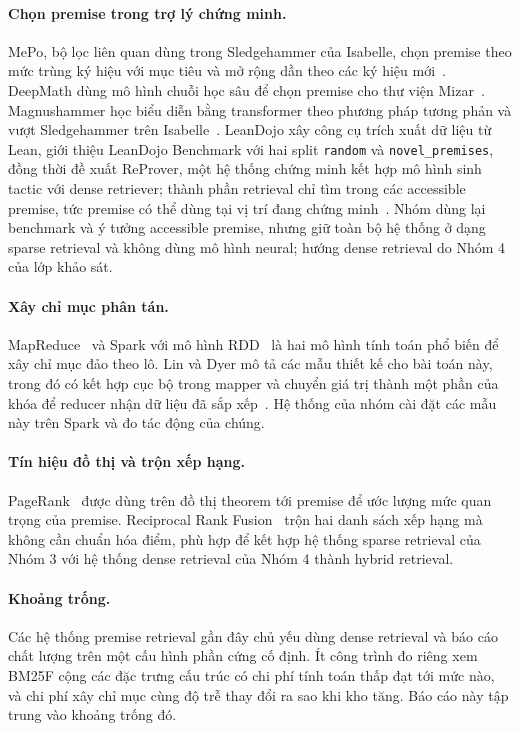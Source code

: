 \documentclass[11pt,a4paper,oneside]{report}
\newcommand{\code}[1]{\texttt{#1}}
\begin{document}
\paragraph{Chọn premise trong trợ lý chứng minh.} MePo, bộ lọc liên quan dùng trong Sledgehammer của Isabelle, chọn
premise theo mức trùng ký hiệu với mục tiêu và mở rộng dần theo các ký hiệu mới~\cite{meng2009}. DeepMath dùng mô hình
chuỗi học sâu để chọn premise cho thư viện Mizar~\cite{irving2016}. Magnushammer học biểu diễn bằng transformer theo
phương pháp tương phản và vượt Sledgehammer trên Isabelle~\cite{mikula2024}. LeanDojo xây công cụ trích xuất dữ liệu từ
Lean, giới thiệu LeanDojo Benchmark với hai split \code{random} và \code{novel\_premises}, đồng thời đề xuất ReProver, một
hệ thống chứng minh kết hợp mô hình sinh tactic với dense retriever; thành phần retrieval chỉ tìm trong các accessible
premise, tức premise có thể dùng tại vị trí đang chứng minh~\cite{yang2023,leandojodocs}.
Nhóm dùng lại benchmark và ý tưởng accessible premise, nhưng giữ toàn bộ hệ thống ở dạng sparse retrieval và không dùng
mô hình neural; hướng dense retrieval do Nhóm 4 của lớp khảo sát.

\paragraph{Xây chỉ mục phân tán.} MapReduce~\cite{dean2004} và Spark với mô hình RDD~\cite{zaharia2012,sparkdocs} là
hai mô hình tính toán phổ biến để xây chỉ mục đảo theo lô. Lin và Dyer mô tả các mẫu thiết kế cho bài toán này, trong
đó có kết hợp cục bộ trong mapper và chuyển giá trị thành một phần của khóa để reducer nhận dữ liệu đã sắp
xếp~\cite{lin2010}. Hệ thống của nhóm cài đặt các mẫu này trên Spark và đo tác động của chúng.

\paragraph{Tín hiệu đồ thị và trộn xếp hạng.} PageRank~\cite{page1999} được dùng trên đồ thị theorem tới premise để ước
lượng mức quan trọng của premise. Reciprocal Rank Fusion~\cite{cormack2009} trộn hai danh sách xếp hạng mà không cần
chuẩn hóa điểm, phù hợp để kết hợp hệ thống sparse retrieval của Nhóm 3 với hệ thống dense retrieval của Nhóm 4 thành
hybrid retrieval.

\paragraph{Khoảng trống.} Các hệ thống premise retrieval gần đây chủ yếu dùng dense retrieval và báo cáo chất lượng
trên một cấu hình phần cứng cố định. Ít công trình đo riêng xem BM25F cộng các đặc trưng cấu trúc có chi phí tính toán thấp đạt tới mức nào, và
chi phí xây chỉ mục cùng độ trễ thay đổi ra sao khi kho tăng. Báo cáo này tập trung vào khoảng trống đó.
\end{document}
